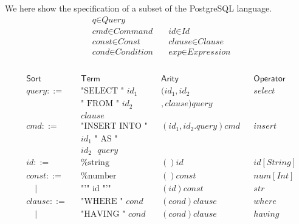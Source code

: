 \documentclass[sigplan,screen]{acmart}
\begin{document}
\begin{example}\label{ex:as-sql-lang}
  We here show the specification of a subset of the PostgreSQL\cite{postgresql-about} language.
%
  \[
    \begin{aligned}
       & \textit{q} \in \textit{Query}                                                       \\
       & \textit{cmd} \in \textit{Command}      \quad & \textit{id} \in \textit{Id}          \\
       & \textit{const} \in \textit{Const}      \quad & \textit{clause} \in \textit{Clause}  \\
       & \textit{cond} \in \textit{Condition}   \quad & \textit{exp} \in \textit{Expression} \\
    \end{aligned}
  \]
  \\
  \[
    \begin{aligned}
       & \textsf{Sort} &  & \textsf{Term}                     &   & \textsf{Arity}            &  & \textsf{Operator} \\
       & query ::=   &  & \text{"SELECT " $id_1$}         &   & (id_1,id_2 &  & select          \\
        &             &  & \text{" FROM " $id_2$}         &   &  ,clause)query \\
        &             &  & \text{$clause$}                                                                       \\
       & cmd ::=     &  & \text{"INSERT INTO "}    &   & (id_1,id_2.query)cmd    &  & insert          \\
       &             &  & \text{$id_1$ " AS "}    &                                                  \\
       &             &  & \text{$id_2$ $query$}    &                                                  \\
       & id ::=      &  & \text{\%string}                 &   & ()id                    &  & id[String]      \\
       & const ::=   &  & \text{\%number}                 &   & ()const                 &  & num[Int]        \\
       & \quad |     &  & \text{"'" id "'"}               &   & (id)const               &  & str             \\
       & clause ::=  &  & \text{"WHERE " $cond$}          &   & (cond)clause            &  & where           \\
       & \quad |     &  & \text{"HAVING " $cond$}         &   & (cond)clause            &  & having          \\

\end{aligned}\]
\end{example}
\end{document}
